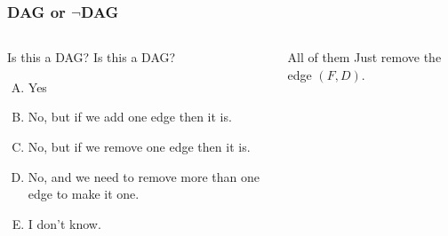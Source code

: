 \begin{frame}
	\frametitle{DAG or $\neg$DAG}
	
	\begin{columns}
			
		\begin{questionblock}{Is this a DAG?}
		\pause
			Is this a DAG?
			\begin{enumerate}[A.]
				\item Yes
				\item No, but if we add one edge then it is.
				\item No, but if we remove one edge then it is.
				\item No, and we need to remove more than one edge to make it one.
				\item I don't know.
			\end{enumerate}
		\end{questionblock}
		\pause
		\vspace{-10pt}
		\begin{answerblock}{All of them}
			Just remove the edge $(F,D)$.
		\end{answerblock}
	\end{columns}
\end{frame}
